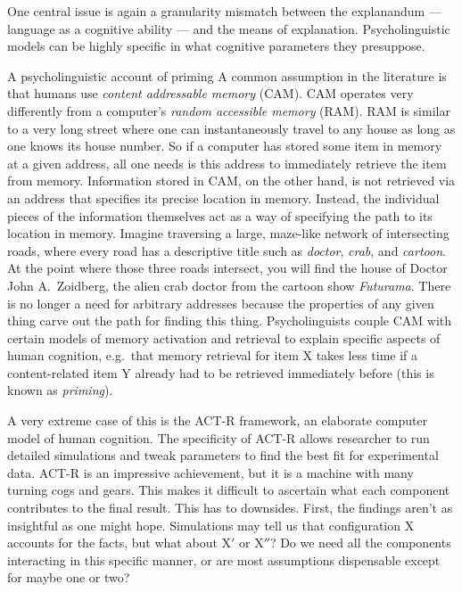 One central issue is again a granularity mismatch between the explanandum --- language as a cognitive ability --- and the means of explanation.
Psycholinguistic models can be highly specific in what cognitive parameters they presuppose.
%
\begin{examplebox}{A psycholinguistic account of priming}
    A common assumption in the literature is that humans use \emph{content addressable memory} (CAM).
    CAM operates very differently from a computer's \emph{random accessible memory} (RAM).
    RAM is similar to a very long street where one can instantaneously travel to any house as long as one knows its house number.
    So if a computer has stored some item in memory at a given address, all one needs is this address to immediately retrieve the item from memory.
    Information stored in CAM, on the other hand, is not retrieved via an address that specifies its precise location in memory.
    Instead, the individual pieces of the information themselves act as a way of specifying the path to its location in memory.
    Imagine traversing a large, maze-like network of intersecting roads, where every road has a descriptive title such as \emph{doctor}, \emph{crab}, and \emph{cartoon}. 
    At the point where those three roads intersect, you will find the house of Doctor John A.~Zoidberg, the alien crab doctor from the cartoon show \emph{Futurama}.
    There is no longer a need for arbitrary addresses because the properties of any given thing carve out the path for finding this thing.
    Psycholinguists couple CAM with certain models of memory activation and retrieval to explain specific aspects of human cognition, e.g.~that memory retrieval for item X takes less time if a content-related item Y already had to be retrieved immediately before (this is known as \emph{priming}).
\end{examplebox}
%
A very extreme case of this is the ACT-R framework, an elaborate computer model of human cognition.
The specificity of ACT-R allows researcher to run detailed simulations and tweak parameters to find the best fit for experimental data.
ACT-R is an impressive achievement, but it is a machine with many turning cogs and gears.
This makes it difficult to ascertain what each component contributes to the final result.
This has to downsides.
First, the findings aren't as insightful as one might hope.
Simulations may tell us that configuration X accounts for the facts, but what about X$'$ or X$''$?
Do we need all the components interacting in this specific manner, or are most assumptions dispensable except for maybe one or two?

